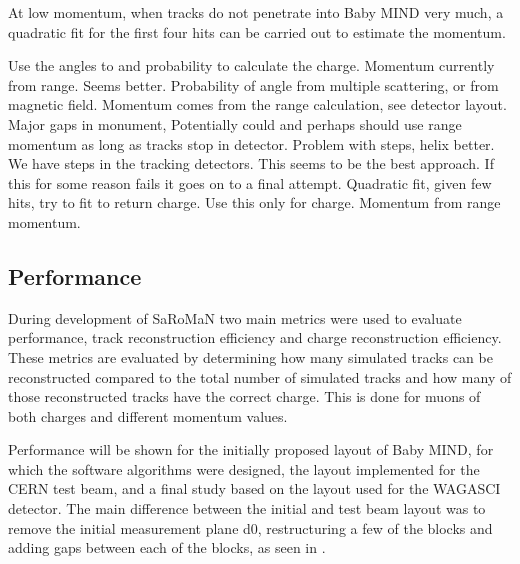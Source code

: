 

At low momentum, when tracks do not penetrate into Baby MIND very much, a quadratic fit for the first four hits can be carried out to estimate the momentum.

Use the angles to and probability to calculate the charge. Momentum currently from range. Seems better.
Probability of angle from multiple scattering, or from magnetic field. 
Momentum comes from the range calculation, see detector layout. Major gaps in monument,  Potentially could and perhaps should use range momentum as long as tracks stop in detector. Problem with steps, helix better.
We have steps in the tracking detectors.
This seems to be the best approach. If this for some reason fails it goes on to a final attempt.
Quadratic fit, given few hits, try to fit to return charge. Use this only for charge. Momentum from range momentum.
\fi

\subsection{Performance}


During development of SaRoMaN two main metrics were used to evaluate performance, track reconstruction efficiency and charge reconstruction efficiency. These metrics are evaluated by determining how many simulated tracks can be reconstructed compared to the total number of simulated tracks and how many of those reconstructed tracks have the correct charge. This is done for muons of both charges and different momentum values.

Performance will be shown for the initially proposed layout of Baby MIND, for which the software algorithms were designed, the layout implemented for the CERN test beam, and a final study based on the layout used for the WAGASCI detector. The main difference between the initial and test beam layout was to remove the initial measurement plane d0, restructuring a few of the blocks and adding gaps between each of the blocks, as seen in . %

